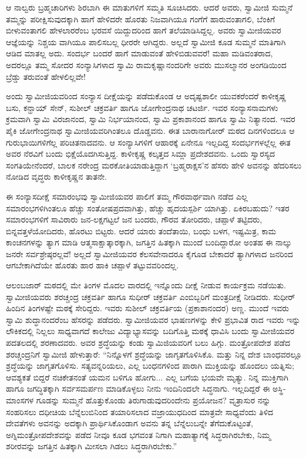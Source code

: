 ಆ ನಾಲ್ವರು ಬ್ರಹ್ಮಚಾರಿಗಳು ಶಿರಬಾಗಿ ಈ ಮಾತುಗಳಿಗೆ ಸಮ್ಮತಿ ಸೂಚಿಸಿದರು. ಆದರೆ ಅವರು, ಸ್ವಾಮೀಜಿ ಸುಮ್ಮನೆ ತಮ್ಮನ್ನು ಪರೀಕ್ಷಿಸುವುದಕ್ಕಾಗಿ ಹಾಗೆ ಹೇಳಿದರೇ ಹೊರತು ನಿಜವಾಗಿಯೂ ಗಂಗೆಗೆ ಹಾರುವಂತಾಗಲಿ, ಬೆಂಕಿಗೆ ಬೀಳುವಂತಾಗಲಿ ಹೇಳಲಾರರೆಂಬ ಭರವಸೆ ಯಿದ್ದುದರಿಂದ ಹಾಗೆ ತಲೆಯಾಡಿಸಿದ್ದಲ್ಲ. ಅವರು ಸ್ವಾಮೀಜಿಯವರ ಆಜ್ಞೆಯನ್ನು ನಿಶ್ಚಯ ವಾಗಿಯೂ ಪಾಲಿಸಬಲ್ಲ ಧೀರರೇ ಆಗಿದ್ದರು. ಅಲ್ಲದೆ ಸ್ವಾಮೀಜಿ ಕೂಡ ಸುಮ್ಮನೆ ಮಾತಿಗಾಗಿ ಆಡಿದ ಮಾತಲ್ಲ ಅದು. ಸಂದರ್ಭ ಬಂದರೆ ಹಾಗೆ ಮಾಡುವಂತೆ ಹೇಳಿಬಿಡುವವರೆ! ಮಹಾ ಮಡಿವಂತರಾದ, ಅದರಲ್ಲೂ ತಮ್ಮ ಸೋದರ ಸಂನ್ಯಾಸಿಗಳಾದ ಸ್ವಾಮಿ ರಾಮಕೃಷ್ಣಾನಂದರಿಗೇ ಅವರು ಮುಸಲ್ಮಾನರ ಅಂಗಡಿಯಿಂದ ಬ್ರೆಡ್ಡು ತರುವಂತೆ ಹೇಳಲಿಲ್ಲವೇ!

ಅಂದು ಸ್ವಾಮೀಜಿಯವರಿಂದ ಸಂನ್ಯಾಸ ದೀಕ್ಷೆಯನ್ನು ಪಡೆದುಕೊಂಡ ಆ ಅದೃಷ್ಟಶಾಲೀ ಯುವಕರೆಂದರೆ ಕಾಳೀಕೃಷ್ಣ ಬಸು, ಕನ್ಹಾಯ್ ಸೇನ್, ಸುಶೀಲ್ ಚಕ್ರವರ್ತಿ ಹಾಗೂ ಜೋಗೇಂದ್ರನಾಥ ಚಟರ್ಜಿ. ಇವರ ಸಂನ್ಯಾಸನಾಮಗಳು ಕ್ರಮವಾಗಿ ಸ್ವಾಮಿ ವಿರಜಾನಂದ, ಸ್ವಾಮಿ ನಿರ್ಭಯಾನಂದ, ಸ್ವಾಮಿ ಪ್ರಕಾಶಾನಂದ ಹಾಗೂ ಸ್ವಾಮಿ ನಿತ್ಯಾನಂದ. ಇವರ ಪೈಕಿ ಜೋಗೇಂದ್ರನಾಥ ಸ್ವಾಮೀಜಿಯವರಿಗಿಂತಲೂ ದೊಡ್ಡವನು. ಈತ ಬಾರಾನಾಗೋರ್ ಮಠದ ದಿನಗಳಿಂದಲೂ ಆ ಗುರುಭಾಯಿಗಳಿಗೆಲ್ಲ ಪರಿಚಿತನಾದವನು. ಆ ಸಂನ್ಯಾಸಿಗಳಿಗೆ ಆಹಾರಕ್ಕೆ ಏನೇನೂ ಇಲ್ಲದಿದ್ದ ಸಂದರ್ಭಗಳಲ್ಲೆಲ್ಲ ಈತ ಅವರ ನೆರವಿಗೆ ಬಂದು ಭಿಕ್ಷೆಯೊದಗಿಸುತ್ತಿದ್ದ. ಕಾಳೀಕೃಷ್ಣ ಕಲ್ಕತ್ತದ ಸಿಮ್ಲಾ ಪ್ರದೇಶದವನು. ಒಂದು ಸ್ವಾರಸ್ಯದ ಸಂಗತಿಯೇನೆಂದರೆ, ಬಾಲಕ ನರೇಂದ್ರ ಮರಕೋತಿಯಾಡುತ್ತಿದ್ದಾಗ ‘ಬ್ರಹ್ಮರಾಕ್ಷಸ’ನ ಹೆಸರು ಹೇಳಿ ಅವನನ್ನು ಹೆದರಿಸಲು ನೋಡಿದ ವೃದ್ಧರು ಕಾಳೀಕೃಷ್ಣನ ತಾತನೇ.

ಈ ಸಂನ್ಯಾಸದೀಕ್ಷೆ ಸಮಾರಂಭವು ಸ್ವಾಮೀಜಿಯವರ ಪಾಲಿಗೆ ತಮ್ಮ ಗೌರವಾರ್ಥವಾಗಿ ನಡೆದ ಎಲ್ಲ ಸಮಾರಂಭಗಳಿಗಿಂತಲೂ ಹೆಚ್ಚು ಸಂತೋಷಪ್ರದವಾಗಿತ್ತು, ಹೆಚ್ಚು ಹೃದಯಸ್ಪರ್ಶಿ ಯಾಗಿತ್ತು. ಏಕಿರಬಹುದು? ಇತರ ಸಮಾರಂಭಗಳಿಗೆ ಸಾವಿರಾರು ಜನ-ಲಕ್ಷಗಟ್ಟಲೆ ಜನ ಬಂದರು, ಗೌರವ ತೋರಿದರು, ಚಪ್ಪಾಳೆ ತಟ್ಟಿದರು, ಬಿನ್ನವತ್ತಳೆಯೋದಿದರು, ಹೊರಟು ಬಿಟ್ಟರು. ಆದರೆ ಯಾರು ತಂದೆತಾಯಿ, ಬಂಧು ಬಳಗ, ಇಷ್ಟಮಿತ್ರ, ಕಾಮ ಕಾಂಚನಗಳನ್ನು ತ್ಯಾಗ ಮಾಡಿ ಆತ್ಮಸಾಕ್ಷಾತ್ಕಾರಕ್ಕಾಗಿ, ಜಗತ್ತಿನ ಹಿತಕ್ಕಾಗಿ ಮುಂದೆ ಬಂದಿದ್ದಾರೋ ಅಂತಹ ಈ ನಾಲ್ಕು ಜನರೇ ಸರ್ವಶ್ರೇಷ್ಠರಲ್ಲವೆ! ಅಲ್ಲದೆ ಸ್ವಾಮೀಜಿಯವರ ಕೆಲಸವೇನಾದರೂ ಕೈಗೂಡ ಬೇಕಾದರೆ ತ್ಯಾಗಿಗಳಾದ ಜನರಿಂದ ಆಗಬೇಕಾಗಿದೆಯೇ ಹೊರತು ಹಾರ ಹಾಕಿ ಚಪ್ಪಾಳೆ ತಟ್ಟುವವರಿಂದಲ್ಲ.

ಆಲಂಬಜಾರ್ ಮಠದಲ್ಲಿ ಮೇ ತಿಂಗಳ ಮೊದಲ ವಾರದಲ್ಲಿ ಇನ್ನೊಂದು ದೀಕ್ಷೆ ನೀಡುವ ಕಾರ್ಯಕ್ರಮ ನಡೆಯಿತು. ಸ್ವಾಮೀಜಿಯವರು ಶರಚ್ಚಂದ್ರ ಚಕ್ರವರ್ತಿ ಹಾಗೂ ಸುಧೀರ್ ಚಕ್ರವರ್ತಿ ಎಂಬಿಬ್ಬರಿಗೆ ಮಂತ್ರದೀಕ್ಷೆ ನೀಡಿದರು. ಸುಧೀರ್ ಹಿಂದಿನ ತಿಂಗಳಷ್ಟೇ ಮಠಕ್ಕೆ ಸೇರಿದ್ದರು. ಇವರು ಸುಶೀಲ್ ಚಕ್ರವರ್ತಿಯ (ಪ್ರಕಾಶಾನಂದರ) ಅಣ್ಣ. ಮುಂದೆ ಇವರು ಸ್ವಾಮಿ ಶುದ್ಧಾನಂದರೆಂಬ ಹೆಸರನ್ನು ಪಡೆದರು. ಸ್ವಾಮೀಜಿಯವರ ಭಾಷಣಗಳನ್ನು ಕೇಳಿ ಪ್ರಭಾವಿತ ರಾದ ಇವರು ಇನ್ನು ಲೌಕಿಕದಲ್ಲಿ ನಿಲ್ಲಲು ಸಾಧ್ಯವಾಗದೆ ಕಾಲೇಜು ವಿದ್ಯಾಭ್ಯಾಸವನ್ನು ಬದಿಗೊತ್ತಿ ಮಠಕ್ಕೆ ಧಾವಿಸಿ ಬಂದು ಸ್ವಾಮೀಜಿಯವರ ಪದತಲದಲ್ಲಿ ಶರಣಾದವರು. ಅವರ ಶ್ರದ್ಧೆಯನ್ನು ಕಂಡು ಸ್ವಾಮಿಜಿಯವರಿಗೆ ಬಲು ಹಿಗ್ಗು. ಮಂತ್ರೋಪದೇಶ ಪಡೆದ ಶರಚ್ಚಂದ್ರನಿಗೆ ಸ್ವಾಮೀಜಿ ಹೇಳುತ್ತಾರೆ: “ನಿನ್ನೊಳಗೆ ಶ್ರದ್ಧೆಯನ್ನು ಜಾಗೃತಗೊಳಿಸಿಕೊ. ಮತ್ತು ನಿನ್ನ ದೇಶ ಬಾಂಧವರಲ್ಲೂ ಶ್ರದ್ಧೆಯನ್ನು ಜಾಗೃತಗೊಳಿಸು. ಸತ್ಯವನ್ನರಿಯಲು, ಎಲ್ಲ ಬಂಧನಗಳಿಂದ ಪಾರಾಗಿ ಮುಕ್ತಿಯನ್ನು ಹೊಂದಲು ಯತ್ನಿಸು; ಆವಶ್ಯಕತೆ ಬಿದ್ದರೆ ನಚಿಕೇತನಂತೆ ಯಮನ ಬಳಿಗೂ ಹೋಗು... ಎಲ್ಲ ಬಗೆಯ ಭಯವೇ ಮೃತ್ಯು. ನಿನ್ನ ಮುಕ್ತಿಗಾಗಿ ಹಾಗೂ ಜಗದ್ಧಿತಕ್ಕಾಗಿ ಸರ್ವಸಮರ್ಪಣ ಮಾಡಿಕೊಳ್ಳಲು ನೀನು ಇಂದಿನಿಂದಲೇ ಸಿದ್ಧನಾಗು. ಇಲ್ಲದಿದ್ದರೆ ಈ ಅಸ್ಥಿ-ಮಾಂಸಗಳ ಗೂಡನ್ನು ಸುಮ್ಮನೆ ಹೊತ್ತುಕೊಂಡು ತಿರುಗಾಡುವುದರಿಂದೇನು ಪ್ರಯೋಜನ? ವೃತ್ರಾಸುರ ನನ್ನು ಸಂಹರಿಸಲು ದಧೀಚಿಯ ಬೆನ್ನೆಲುಬಿನಿಂದ ತಯಾರಿಸಲಾದ ವಜ್ರಾಯುಧದಿಂದ ಮಾತ್ರವೇ ಸಾಧ್ಯವೆಂದು ತಿಳಿದ ದೇವತೆಗಳು ಅವನನ್ನು ಅದಕ್ಕಾಗಿ ಪ್ರಾರ್ಥಿಸಿಕೊಂಡಾಗ ಅವನು ತನ್ನ ಬೆನ್ನೆಲುಬನ್ನೇ ತೆಗೆದುಕೊಟ್ಟಂತೆ, ಅಗ್ನಿಮಂತ್ರೋಪದೇಶವನ್ನು ಪಡೆದ ನೀವೂ ಕೂಡ ಭಗವಂತ ನಿಗಾಗಿ ಮಹಾತ್ಯಾಗಕ್ಕೆ ಸಿದ್ಧರಾಗಿರಬೇಕು, ನಿಮ್ಮ ಶರೀರವನ್ನು ಜಗತ್ತಿನ ಹಿತಕ್ಕಾಗಿ ಮೀಸಲಾ ಗಿಡಲು ಸಿದ್ಧರಾಗಿರಬೇಕು.”

